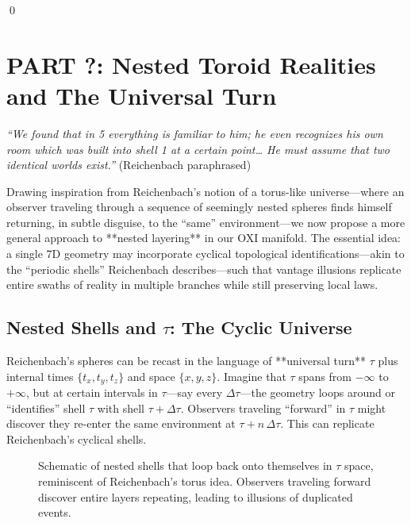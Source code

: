 \documentclass{article}
\begin{document}
\qed








\section{PART ?: Nested Toroid Realities and The Universal Turn}

\noindent
\textit{“We found that in 5 everything is familiar to him; he even recognizes his own room which was built into shell 1 at a certain point… He must assume that two identical worlds exist.”}
\hfill (Reichenbach paraphrased)

\vspace{1em}

Drawing inspiration from Reichenbach’s notion of a torus-like universe—where an observer traveling through a sequence of seemingly nested spheres finds himself returning, in subtle disguise, to the “same” environment—we now propose a more general approach to **nested layering** in our OXI manifold. The essential idea: a single 7D geometry may incorporate cyclical topological identifications—akin to the “periodic shells” Reichenbach describes—such that vantage illusions replicate entire swaths of reality in multiple branches while still preserving local laws.

\subsection{Nested Shells and $\tau$: The Cyclic Universe}

Reichenbach’s spheres can be recast in the language of **universal turn** $\tau$ plus internal times $\{t_x, t_y, t_z\}$ and space $\{x, y, z\}$. Imagine that $\tau$ spans from $-\infty$ to $+\infty$, but at certain intervals in $\tau$—say every $\Delta\tau$—the geometry loops around or “identifies” shell $\tau$ with shell $\tau + \Delta\tau$. Observers traveling “forward” in $\tau$ might discover they re-enter the same environment at $\tau + n\,\Delta\tau$. This can replicate Reichenbach’s cyclical shells.

\begin{figure}[ht]
\centering
\caption{\small Schematic of nested shells that loop back onto themselves in $\tau$ space, reminiscent of Reichenbach’s torus idea. Observers traveling forward discover entire layers repeating, leading to illusions of duplicated events.}
\end{figure}
\end{document}
